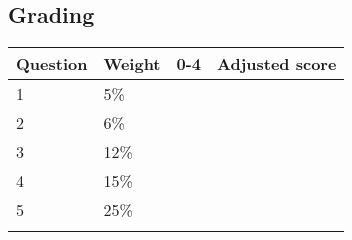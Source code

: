\documentclass[a4paper,12pt]{book}
\begin{document}
    \hrulefill
    \subsection*{Grading}
            
    \begin{center}
        
        \begin{tabular}{ | l | l | l | l | }
            \hline
            \textbf{ Question } & \textbf{ Weight } & \textbf{ 0-4 } & \textbf{ Adjusted score }
            \\ \hline
            
            1 & 5\% & &    \\ \hline
            
            2 & 6\% & &    \\ \hline
            
            3 & 12\% & &    \\ \hline
            
            4 & 15\% & &    \\ \hline
            
            5 & 25\% & &    \\ \hline

            & & & \\ \hline
            
            
            
        \end{tabular}
    \end{center}
\end{document}
